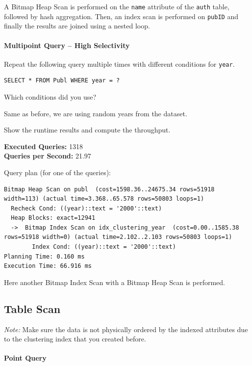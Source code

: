 \documentclass[11pt]{scrartcl}
\begin{document}
A Bitmap Heap Scan is performed on the \texttt{name} attribute of the \texttt{auth} table, followed by hash aggregation.
Then, an index scan is performed on \texttt{pubID} and finally the results are joined using a nested loop.

\paragraph{Multipoint Query -- High Selectivity}

Repeat the following query multiple times with different conditions for \texttt{year}.

\begin{lstlisting}[style=dbtsql]
SELECT * FROM Publ WHERE year = ?
\end{lstlisting}

Which conditions did you use?

Same as before, we are using random years from the dataset.

Show the runtime results and compute the throughput.

\textbf{Executed Queries: } 1318\\
\textbf{Queries per Second: } 21.97

Query plan (for one of the queries):

{\small
\parskip0pt\begin{verbatim}
Bitmap Heap Scan on publ  (cost=1598.36..24675.34 rows=51918 width=113) (actual time=3.368..65.578 rows=50803 loops=1)
  Recheck Cond: ((year)::text = '2000'::text)
  Heap Blocks: exact=12941
  ->  Bitmap Index Scan on idx_clustering_year  (cost=0.00..1585.38 rows=51918 width=0) (actual time=2.102..2.103 rows=50803 loops=1)
        Index Cond: ((year)::text = '2000'::text)
Planning Time: 0.160 ms
Execution Time: 66.916 ms
\end{verbatim}}

Here another Bitmap Index Scan with a Bitmap Heap Scan is performed.

\subsection*{Table Scan}

\emph{Note:} Make sure the data is not physically ordered by the indexed attributes due to the clustering index that you created before.

\paragraph{Point Query}
\end{document}
